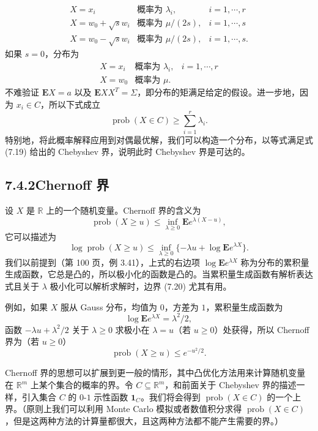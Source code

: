 \documentclass[UTF8, 12pt, fontset=fandol, oneside]{ctexart}
\begin{document}
\[
\begin{array}{lll}
X=x_i & \text{概率为 } \lambda_i, & i=1,\cdots,r\\
X=w_0+\sqrt{s}w_i & \text{概率为 } \mu/(2s), & i=1,\cdots,s\\
X=w_0-\sqrt{s}w_i & \text{概率为 } \mu/(2s), & i=1,\cdots,s.
\end{array}
\]
如果 $s=0$，分布为
\[
\begin{array}{lll}
X=x_i & \text{概率为 } \lambda_i, & i=1,\cdots,r\\
X=w_0 & \text{概率为 } \mu.
\end{array}
\]
不难验证 $\mathbf{E}X=a$ 以及 $\mathbf{E}XX^T=\Sigma$，即分布的矩满足给定的假设。进一步地，因为 $x_i\in C$，所以下式成立
\[
\operatorname{prob}(X\in C)\geq \sum_{i=1}^r\lambda_i.
\]
特别地，将此概率解释应用到对偶最优解，我们可以构造一个分布，以等式满足式 (7.19) 给出的 Chebyshev 界，说明此时 Chebyshev 界是可达的。

\subsection*{7.4.2\quad Chernoff 界}

设 $X$ 是 $\mathbb{R}$ 上的一个随机变量。Chernoff 界的含义为
\[
\operatorname{prob}(X\geq u)\leq \inf_{\lambda\geq 0}\mathbf{E}e^{\lambda(X-u)},
\]
它可以描述为
\begin{equation}
\log\operatorname{prob}(X\geq u)\leq \inf_{\lambda\geq 0}\{-\lambda u+\log\mathbf{E}e^{\lambda X}\}.
\tag{7.20}
\end{equation}
我们以前提到（第 100 页，例 3.41），上式的右边项 $\log\mathbf{E}e^{\lambda X}$ 称为分布的累积量生成函数，它总是凸的，所以极小化的函数是凸的。当累积量生成函数有解析表达式且关于 $\lambda$ 极小化可以解析求解时，边界 (7.20) 尤其有用。

例如，如果 $X$ 服从 Gauss 分布，均值为 $0$，方差为 $1$，累积量生成函数为
\[
\log\mathbf{E}e^{\lambda X}=\lambda^2/2,
\]
函数 $-\lambda u+\lambda^2/2$ 关于 $\lambda\geq 0$ 求极小在 $\lambda=u$（若 $u\geq 0$）处获得，所以 Chernoff 界为（若 $u\geq 0$）
\[
\operatorname{prob}(X\geq u)\leq e^{-u^2/2}.
\]

Chernoff 界的思想可以扩展到更一般的情形，其中凸优化方法用来计算随机变量在 $\mathbb{R}^m$ 上某个集合的概率的界。令 $C\subseteq\mathbb{R}^m$，和前面关于 Chebyshev 界的描述一样，引入集合 $C$ 的 $0$-$1$ 示性函数 $\mathbf{1}_C$。我们将会得到 $\operatorname{prob}(X\in C)$ 的一个上界。（原则上我们可以利用 Monte Carlo 模拟或者数值积分求得 $\operatorname{prob}(X\in C)$，但是这两种方法的计算量都很大，且这两种方法都不能产生需要的界。）
\end{document}
